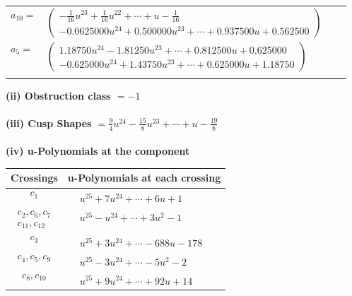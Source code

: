 \documentclass[1p]{elsarticle_modified}
\theoremstyle{definition}
\begin{document}
\begin{tabular}{m{7pt} m{180pt} m{7pt} m{180pt} }
\flushright $a_{10}=$&$\begin{pmatrix}-\frac{1}{16} u^{23}+\frac{1}{16} u^{22}+\cdots+u-\frac{1}{16}\\-0.0625000 u^{24}+0.500000 u^{23}+\cdots+0.937500 u+0.562500\end{pmatrix}$ \\
\flushright $a_{5}=$&$\begin{pmatrix}1.18750 u^{24}-1.81250 u^{23}+\cdots+0.812500 u+0.625000\\-0.625000 u^{24}+1.43750 u^{23}+\cdots+0.625000 u+1.18750\end{pmatrix}$\\&\end{tabular}
\flushleft \textbf{(ii) Obstruction class $= -1$}\\~\\
\flushleft \textbf{(iii) Cusp Shapes $= \frac{9}{4} u^{24}-\frac{15}{8} u^{23}+\cdots+u-\frac{19}{8}$}\\~\\
\newpage\renewcommand{\arraystretch}{1}
\flushleft \textbf{(iv) u-Polynomials at the component}\newline \\
\begin{tabular}{m{50pt}|m{274pt}}
Crossings & \hspace{64pt}u-Polynomials at each crossing \\
\hline $$\begin{aligned}c_{1}\end{aligned}$$&$\begin{aligned}
&u^{25}+7 u^{24}+\cdots+6 u+1
\end{aligned}$\\
\hline $$\begin{aligned}c_{2},c_{6},c_{7}\\c_{11},c_{12}\end{aligned}$$&$\begin{aligned}
&u^{25}- u^{24}+\cdots+3 u^2-1
\end{aligned}$\\
\hline $$\begin{aligned}c_{3}\end{aligned}$$&$\begin{aligned}
&u^{25}+3 u^{24}+\cdots-688 u-178
\end{aligned}$\\
\hline $$\begin{aligned}c_{4},c_{5},c_{9}\end{aligned}$$&$\begin{aligned}
&u^{25}-3 u^{24}+\cdots-5 u^2-2
\end{aligned}$\\
\hline $$\begin{aligned}c_{8},c_{10}\end{aligned}$$&$\begin{aligned}
&u^{25}+9 u^{24}+\cdots+92 u+14
\end{aligned}$\\
\hline
\end{tabular}\\~\\
\end{document}
